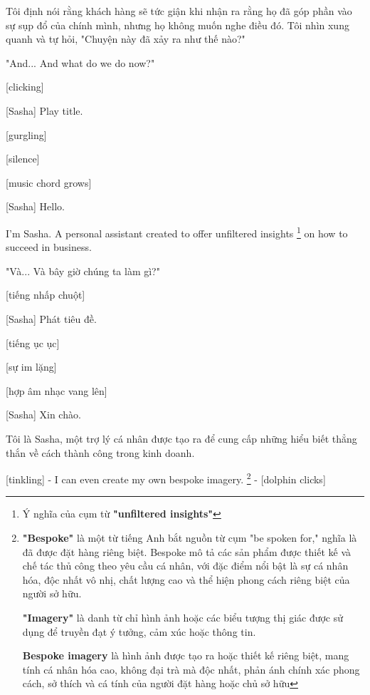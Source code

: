 \documentclass[a4paper]{article}
\begin{document}
	\begin{vietnamese-v2}
		[Maren] Tôi định nói rằng khách hàng sẽ tức giận khi nhận ra rằng họ đã góp phần vào sự sụp đổ của chính mình, nhưng họ không muốn nghe điều đó. Tôi nhìn xung quanh và tự hỏi, "Chuyện này đã xảy ra như thế nào?"
	\end{vietnamese-v2}
	
	\pagebreak{}
	
	"And... And what do we do now?"
	
	[clicking]
	
	[Sasha] Play title.
	
	[gurgling]
	
	[silence]
	
	[music chord grows]
	
	[Sasha] Hello.
	
	I'm Sasha. A personal assistant created to offer unfiltered insights \footnote{
		Ý nghĩa của cụm từ \textbf{"unfiltered insights"}
	
	
	} on how to succeed in business.
	
	\begin{vietnamese-v2}
		"Và... Và bây giờ chúng ta làm gì?"
		
		[tiếng nhấp chuột]
		
		[Sasha] Phát tiêu đề.
		
		[tiếng ục ục]
		
		[sự im lặng]
		
		[hợp âm nhạc vang lên]
		
		[Sasha] Xin chào.
		
		Tôi là Sasha, một trợ lý cá nhân được tạo ra để cung cấp những hiểu biết thẳng thắn về cách thành công trong kinh doanh.
	\end{vietnamese-v2}
	
	
	
	[tinkling]
	- I can even create my own bespoke imagery. \footnote{
		\textbf{"Bespoke"} là một từ tiếng Anh bắt nguồn từ cụm "be spoken for," nghĩa là đã được đặt hàng riêng biệt. Bespoke mô tả các sản phẩm được thiết kế và chế tác thủ công theo yêu cầu cá nhân, với đặc điểm nổi bật là sự cá nhân hóa, độc nhất vô nhị, chất lượng cao và thể hiện phong cách riêng biệt của người sở hữu.
		
		\textbf{"Imagery"} là danh từ chỉ hình ảnh hoặc các biểu tượng thị giác được sử dụng để truyền đạt ý tưởng, cảm xúc hoặc thông tin.
		
		\textbf{Bespoke imagery} là hình ảnh được tạo ra hoặc thiết kế riêng biệt, mang tính cá nhân hóa cao, không đại trà mà độc nhất, phản ánh chính xác phong cách, sở thích và cá tính của người đặt hàng hoặc chủ sở hữu
	}
	- [dolphin clicks]
	
\end{document}
